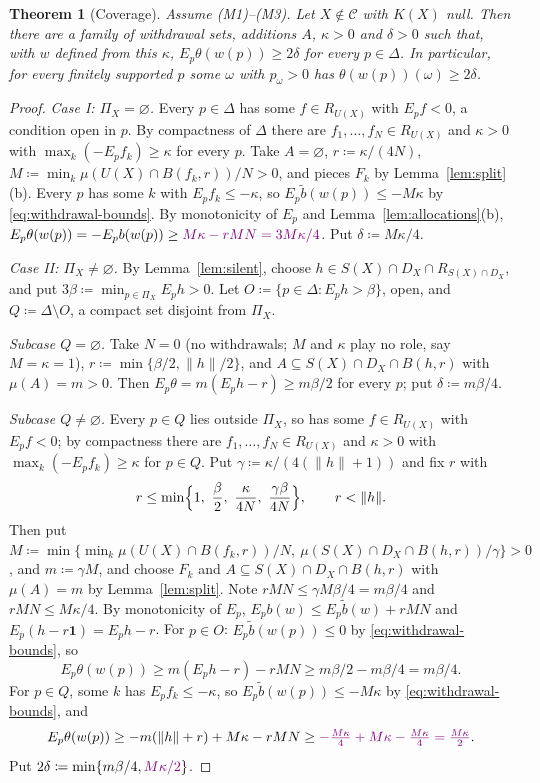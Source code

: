 \documentclass[11pt]{article}
\newcommand{\chgb}[1]{{\color{violet}#1}}
\newtheorem{theorem}{Theorem}[section]
\theoremstyle{definition}
\theoremstyle{remark}
\newcommand{\C}{\mathcal C}
\newcommand{\one}{\mathbf 1}
\begin{document}
\begin{theorem}[Coverage]\label{thm:coverage}
Assume (M1)--(M3). Let $X\notin\C$ with $K(X)$ null. Then there are a family of withdrawal sets, additions $A$, \chgb{$\kappa>0$} and $\delta>0$ such that\chgb{, with $w$ defined from this $\kappa$,} $E_p\theta(w(p))\ge2\delta$ for every $p\in\Delta$. In particular, for every finitely supported $p$ some $\omega$ with $p_\omega>0$ has $\theta(w(p))(\omega)\ge2\delta$.
\end{theorem}
\begin{proof}
\emph{Case I: $\Pi_X=\varnothing$.} Every $p\in\Delta$ has some $f\in R_{U(X)}$ with $E_pf<0$, a condition open in $p$. By compactness of $\Delta$ there are $f_1,\dots,f_N\in R_{U(X)}$ and $\kappa>0$ with $\max_k(-E_pf_k)\ge\kappa$ for every $p$. Take $A=\varnothing$, $r\coloneqq\kappa/(4N)$, $M\coloneqq\min_k\mu(U(X)\cap B(f_k,r))/N>0$, and pieces $F_k$ by Lemma~\ref{lem:split}(b). \chgb{Every $p$ has some $k$ with $E_pf_k\le-\kappa$, so $E_p\tilde b(w(p))\le-M\kappa$ by \eqref{eq:withdrawal-bounds}.} By monotonicity of $E_p$ and Lemma~\ref{lem:allocations}(b), $E_p\theta(w(p))=-E_pb(w(p))\ge \chgb{M\kappa-rMN=3M\kappa/4}$. Put $\delta\coloneqq M\kappa/4$.

\emph{Case II: $\Pi_X\ne\varnothing$.} By Lemma~\ref{lem:silent}, choose $h\in S(X)\cap D_X\cap R_{S(X)\cap D_X}$, and put $3\beta\coloneqq\min_{p\in\Pi_X}E_ph>0$. Let $O\coloneqq\{p\in\Delta:E_ph>\beta\}$, open, and $Q\coloneqq\Delta\setminus O$, a compact set disjoint from $\Pi_X$.

\emph{Subcase $Q=\varnothing$.} Take $N=0$ (no withdrawals; $M$ and \chgb{$\kappa$} play no role, say \chgb{$M=\kappa=1$}), $r\coloneqq\min\{\beta/2,\|h\|/2\}$, and $A\subseteq S(X)\cap D_X\cap B(h,r)$ with $\mu(A)=m>0$. Then $E_p\theta=m(E_ph-r)\ge m\beta/2$ for every $p$; put $\delta\coloneqq m\beta/4$.

\emph{Subcase $Q\ne\varnothing$.} Every $p\in Q$ lies outside $\Pi_X$, so has some $f\in R_{U(X)}$ with $E_pf<0$; by compactness there are $f_1,\dots,f_N\in R_{U(X)}$ and $\kappa>0$ with $\max_k(-E_pf_k)\ge\kappa$ for $p\in Q$. Put $\gamma\coloneqq\kappa/(4(\|h\|+1))$ and fix $r$ with
\[
r\le\min\Bigl\{1,\ \frac\beta2,\ \frac{\kappa}{4N},\ \frac{\gamma\beta}{4N}\Bigr\},\qquad r<\|h\|.
\]
Then put $M\coloneqq\min\{\min_k\mu(U(X)\cap B(f_k,r))/N,\ \mu(S(X)\cap D_X\cap B(h,r))/\gamma\}>0$, \chgb{and} $m\coloneqq\gamma M$, and choose $F_k$ and $A\subseteq S(X)\cap D_X\cap B(h,r)$ with $\mu(A)=m$ by Lemma~\ref{lem:split}. Note $rMN\le\gamma M\beta/4=m\beta/4$ and $rMN\le M\kappa/4$. By monotonicity of $E_p$, $E_pb(w)\le E_p\tilde b(w)+rMN$ and $E_p(h-r\one)=E_ph-r$.
For $p\in O$: \chgb{$E_p\tilde b(w(p))\le0$ by \eqref{eq:withdrawal-bounds}}, so
\[
E_p\theta(w(p))\ge m(E_ph-r)-rMN\ge m\beta/2-m\beta/4=m\beta/4.
\]
For $p\in Q$\chgb{, some $k$ has $E_pf_k\le-\kappa$, so $E_p\tilde b(w(p))\le-M\kappa$ by \eqref{eq:withdrawal-bounds}, and}
\[
E_p\theta(w(p))\ge-m(\|h\|+r)+M\kappa-rMN\ge\chgb{-\tfrac{M\kappa}4+M\kappa-\tfrac{M\kappa}4=\tfrac{M\kappa}2}.
\]
Put $2\delta\coloneqq\min\{m\beta/4,\chgb{M\kappa/2}\}$.


\end{proof}
\end{document}
